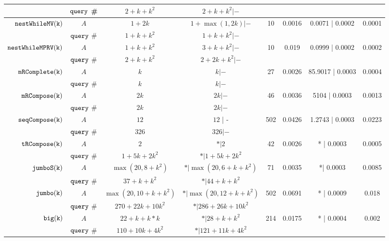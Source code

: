 \begin {table}[H]
\begin{center}
{\begin{tabular}{ r | c | c | c | c | c | c | c  }
         \cline{2-4}
         & ${\tt query}$ \#   & {$2 + k + k^2$} &  $2 + k + k^2| -$ & & & & \\
         \hline
         $  \mathtt{nestWhileMV(k)}$ 
         & $A$ & $1 + 2k $ & $1 + \max(1,2k) | -$  & 10 & 0.0016 & 0.0071 | 0.0002 & 0.0001 \\
         \cline{2-4}
         & ${\tt query}$ \#   & {$1 + k + k^2$} &  $1 + k + k^2 |-$  & & & & \\
         \hline
         \multirow{2}{*}{$\mathtt{nestWhileMPRV(k)}$}
         & $A$  &  $1 + k + k^2$ &  $3 + k + k^2| -$  &  10 & 0.019 & 0.0999 | 0.0002 & 0.0002 \\
         \cline{2-4}
         & ${\tt query}$ \#   & $2 + k + k^2 $ & $2 + 2k + k^2 | - $  & & & & \\
         \hline
         $  \mathtt{mRComplete(k)}$ 
         & $A$ & $k$ & $ k | -  $   &  27 & 0.0026 & 85.9017 | 0.0003 & 0.0004 \\
         \cline{2-4}
         & ${\tt query}$ \#   & $k$ & $k |-$   & & & & \\
         \hline
         $  \mathtt{mRCompose(k)}$ 
         & $A$ & $2k$ & $  2k | -$   &  46 & 0.0036 & 5104 | 0.0003 &  0.0013\\
         \cline{2-4}
         & ${\tt query}$ \#   & {$2k$} & $ 2k | -$   & & & & \\
         \hline
         $  \mathtt{seqCompose(k)}$ 
         & $A$ & $12$ & $12  $ | -  &  502 & 0.0426  & 1.2743 | 0.0003 & 0.0223 \\
         \cline{2-4}
         & ${\tt query}$ \#   & $326$ & $326 | -$   & & & & \\
         \hline
         \multirow{2}{*}{$\mathtt{tRCompose(k)}$} 
         & $A$ & $2$ &  $ * | 2$   &  42 & 0.0026 & * | 0.0003 & 0.0005\\
         \cline{2-4}
         & ${\tt query}$ \#   & $1 + 5k + 2 k^2 $ & $* | 1 + 5k + 2 k^2 $  & & & & \\
         \hline
         \multirow{2}{*}{$\mathtt{{jumboS(k)}}$}
         & $A$ & $ \max(20, 8+k^2)$ &  {$ * | \max(20, 6+k+k^2)$}    &  71 & 0.0035 & *| 0.0003 &  0.0085 \\
         \cline{2-4}
         & ${\tt query}$ \#   & $37+k+k^2 $ & $* | {44+k+k^2}$  & & & & \\
         \hline
         \multirow{2}{*}{$\mathtt{jumbo(k)}$}
         & $A$ & $ \max(20, 10+k+k^2 )$    &  $* | \max(20, 12 + k+ k^2)$   &  502 & 0.0691 & * | 0.0009 & 0.018 \\
         \cline{2-4}
         & ${\tt query}$ \#   & $270 + 22k + 10k^2 $ & $* | 286+26k+10k^2$  & & & & \\
         \hline
         \multirow{2}{*}{$\mathtt{big(k)}$} 
         & $A$ &  $22+k+k*k$  &  $* |28 + k + k^2 $ &  214 & 0.0175 & * | 0.0004 & 0.002 \\
         \cline{2-4}
         & ${\tt query}$ \#   & $110+10k+4k^2$ & $* |121+11k+4k^2 $   & & & & \\
         \hline
        \end{tabular}
}
\end{center}
\end{table}